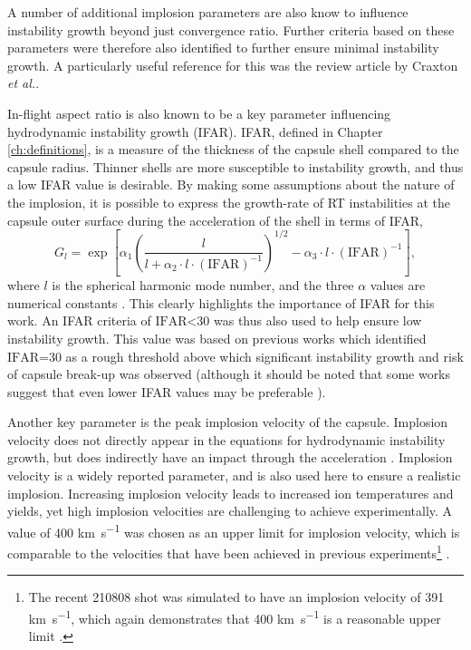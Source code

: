 A number of additional implosion parameters are also know to influence instability growth beyond just convergence ratio. Further criteria based on these parameters were therefore also identified to further ensure minimal instability growth. A particularly useful reference for this was the review article by Craxton \textit{et al.}\cite{Craxton2015}.

In-flight aspect ratio is also known to be a key parameter influencing hydrodynamic instability growth (IFAR). IFAR, defined in Chapter \ref{ch:definitions}, is a measure of the thickness of the capsule shell compared to the capsule radius. Thinner shells are more susceptible to instability growth, and thus a low IFAR value is desirable. By making some assumptions about the nature of the implosion, it is possible to express the growth-rate of RT instabilities at the capsule outer surface during the acceleration of the shell in terms of IFAR, 
\begin{equation} G_l = \exp \left[ \alpha_1 \left( \frac{l}{l + \alpha_2 \cdot l \cdot (\mathrm{IFAR})^{-1}} \right)^{1/2} - \alpha_3 \cdot l \cdot (\mathrm{IFAR})^{-1} \right], \label{eq: IFARGrowth} \end{equation} where $l$ is the spherical harmonic mode number, and the three $\alpha$ values are numerical constants \cite{Atzeni2008}. This clearly highlights the importance of IFAR for this work. An IFAR criteria of $\textrm{IFAR<30}$ was thus also used to help ensure low instability growth. This value was based on previous works which identified $\textrm{IFAR=30}$ as a rough threshold above which significant instability growth and risk of capsule break-up was observed \cite{Lindl1995} (although it should be noted that some works suggest that even lower IFAR values may be preferable \cite{Radha2011, Goncharov2003}).

Another key parameter is the peak implosion velocity of the capsule. Implosion velocity does not directly appear in the equations for hydrodynamic instability growth, but does indirectly have an impact through the acceleration \cite{Atzeni2008}. Implosion velocity is a widely reported parameter, and is also used here to ensure a realistic implosion. Increasing implosion velocity leads to increased ion temperatures and yields, yet high implosion velocities are challenging to achieve experimentally. A value of 400 \unit{\kilo\meter\per\second} was chosen as an upper limit for implosion velocity, which is comparable to the velocities that have been achieved in previous experiments\footnote{The recent 210808 shot was simulated to have an implosion velocity of 391 \unit{\kilo\meter\per\second}, which again demonstrates that 400 \unit{\kilo\meter\per\second} is a reasonable upper limit \cite{Kritcher2022}.} \cite{Craxton2015, Callahan2015}.

